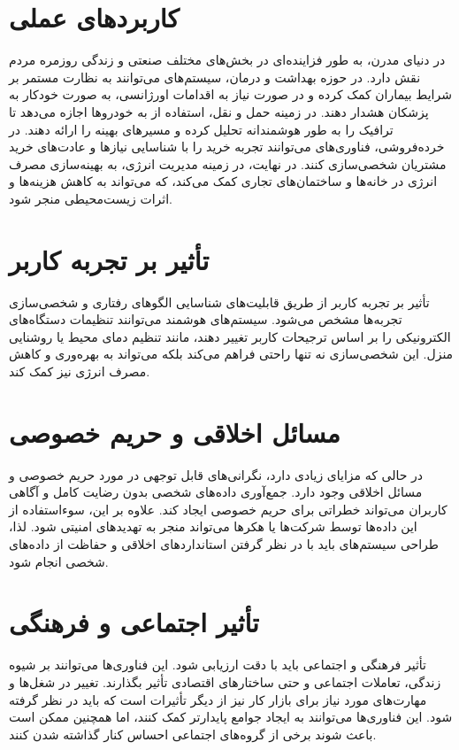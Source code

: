 \section*{کاربردهای عملی }
در دنیای مدرن،
به طور فزاینده‌ای در بخش‌های مختلف صنعتی و زندگی روزمره مردم نقش دارد. در حوزه بهداشت و درمان، سیستم‌های 
می‌توانند به نظارت مستمر بر شرایط بیماران کمک کرده و در صورت نیاز به اقدامات اورژانسی، به صورت خودکار به پزشکان هشدار دهند. در زمینه حمل و نقل، استفاده از
به خودروها اجازه می‌دهد تا ترافیک را به طور هوشمندانه تحلیل کرده و مسیرهای بهینه را ارائه دهند. در خرده‌فروشی، فناوری‌های
می‌توانند تجربه خرید را با شناسایی نیازها و عادت‌های خرید مشتریان شخصی‌سازی کنند. در نهایت، در زمینه مدیریت انرژی،
به بهینه‌سازی مصرف انرژی در خانه‌ها و ساختمان‌های تجاری کمک می‌کند، که می‌تواند به کاهش هزینه‌ها و اثرات زیست‌محیطی منجر شود.

\section*{تأثیر  بر تجربه کاربر}
تأثیر  بر تجربه کاربر از طریق قابلیت‌های شناسایی الگوهای رفتاری و شخصی‌سازی تجربه‌ها مشخص می‌شود. سیستم‌های هوشمند می‌توانند تنظیمات دستگاه‌های الکترونیکی را بر اساس ترجیحات کاربر تغییر دهند، مانند تنظیم دمای محیط یا روشنایی منزل. این شخصی‌سازی نه تنها راحتی فراهم می‌کند بلکه می‌تواند به بهره‌وری و کاهش مصرف انرژی نیز کمک کند.

\section*{مسائل اخلاقی و حریم خصوصی}
در حالی که  مزایای زیادی دارد، نگرانی‌های قابل توجهی در مورد حریم خصوصی و مسائل اخلاقی وجود دارد. جمع‌آوری داده‌های شخصی بدون رضایت کامل و آگاهی کاربران می‌تواند خطراتی برای حریم خصوصی ایجاد کند. علاوه بر این، سوءاستفاده از این داده‌ها توسط شرکت‌ها یا هکرها می‌تواند منجر به تهدیدهای امنیتی شود. لذا، طراحی سیستم‌های  باید با در نظر گرفتن استانداردهای اخلاقی و حفاظت از داده‌های شخصی انجام شود.

\section*{تأثیر اجتماعی و فرهنگی}
تأثیر فرهنگی و اجتماعی  باید با دقت ارزیابی شود. این فناوری‌ها می‌توانند بر شیوه زندگی، تعاملات اجتماعی و حتی ساختارهای اقتصادی تأثیر بگذارند. تغییر در شغل‌ها و مهارت‌های مورد نیاز برای بازار کار نیز از دیگر تأثیرات است که باید در نظر گرفته شود. این فناوری‌ها می‌توانند به ایجاد جوامع پایدارتر کمک کنند، اما همچنین ممکن است باعث شوند برخی از گروه‌های اجتماعی احساس کنار گذاشته شدن کنند.

